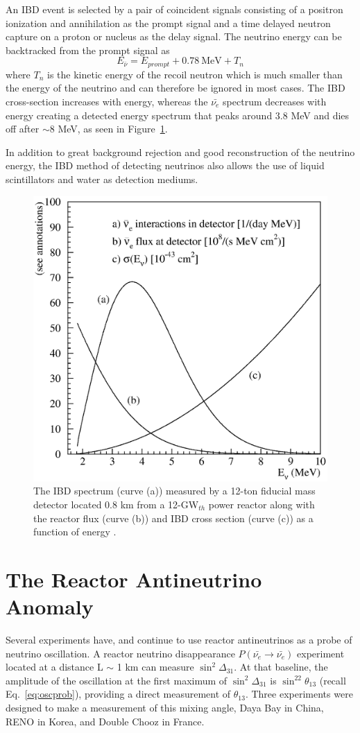 An IBD event is selected by a pair of coincident signals consisting of a positron ionization and annihilation as the prompt signal and a time delayed neutron capture on a proton or nucleus as the delay signal. 
The neutrino energy can be backtracked from the prompt signal as
\begin{equation}	
	E_{\bar{\nu}} = E_{prompt} + 0.78~\textrm{MeV} + T_n
\end{equation}
where $T_n$ is the kinetic energy of the recoil neutron which is much smaller than the energy of the neutrino and can therefore be ignored in most cases. 
The IBD cross-section increases with energy, whereas the $\bar{\nu_{e}}$ spectrum decreases with energy creating a detected energy spectrum that peaks around 3.8 MeV and dies off after $\sim$8 MeV, as seen in Figure~\ref{fig:vogel-fig02}. 

In addition to great background rejection and good reconstruction of the neutrino energy, the IBD method of detecting neutrinos also allows the use of liquid scintillators and water as detection mediums. 

\begin{figure}[h]
	\centering
	\includegraphics[width=0.55\linewidth]{tex/3-reactorneutrinos-images/vogel-fig02}
	\caption[The IBD spectrum.]{The IBD spectrum (curve (a)) measured by a 12-ton fiducial mass detector located 0.8 km from a 12-GW$_{th}$ power reactor along with the reactor flux (curve (b)) and IBD cross section (curve (c)) as a function of energy \cite{PDG}.}
	\label{fig:vogel-fig02}
\end{figure}


\section{The Reactor Antineutrino Anomaly}

Several experiments have, and continue to use reactor antineutrinos as a probe of neutrino oscillation. 
A reactor neutrino disappearance $P(\bar{\nu_{e}} \rightarrow \bar{\nu_{e}})$ experiment located at a distance L $\sim$ 1 km can measure $\sin^2\Delta_{31}$. At that baseline, the amplitude of the oscillation at the first maximum of $\sin^2\Delta_{31}$ is $\sin^22\theta_{13}$ (recall Eq.~\ref{eq:oscprob}), providing a direct measurement of $\theta_{13}$.
Three experiments were designed to make a measurement of this mixing angle, Daya Bay in China, RENO in Korea, and Double Chooz in France. 

